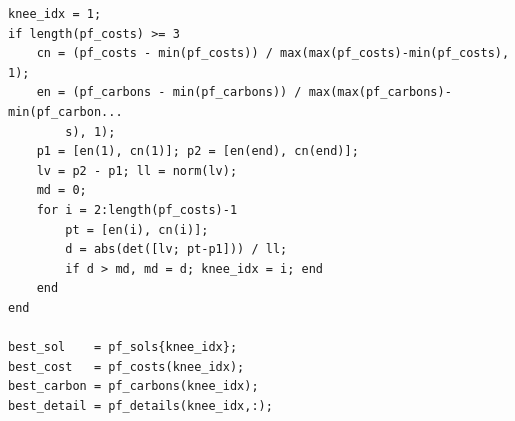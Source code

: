{\begin{verbatim}
knee_idx = 1;
if length(pf_costs) >= 3
    cn = (pf_costs - min(pf_costs)) / max(max(pf_costs)-min(pf_costs), 1);
    en = (pf_carbons - min(pf_carbons)) / max(max(pf_carbons)-min(pf_carbon...
        s), 1);
    p1 = [en(1), cn(1)]; p2 = [en(end), cn(end)];
    lv = p2 - p1; ll = norm(lv);
    md = 0;
    for i = 2:length(pf_costs)-1
        pt = [en(i), cn(i)];
        d = abs(det([lv; pt-p1])) / ll;
        if d > md, md = d; knee_idx = i; end
    end
end

best_sol    = pf_sols{knee_idx};
best_cost   = pf_costs(knee_idx);
best_carbon = pf_carbons(knee_idx);
best_detail = pf_details(knee_idx,:);

\end{verbatim}
}